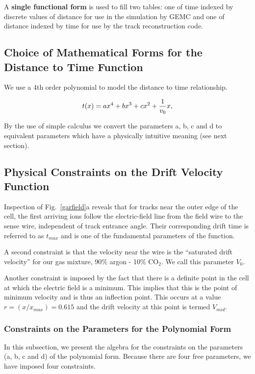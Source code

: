 A {\bf single functional form} is used to fill two tables: one of time indexed by discrete
values of distance for use in the simulation by GEMC and one of 
distance indexed by time for use by the track reconstruction code.


\subsection{Choice of Mathematical Forms for the Distance to Time Function}
We use a 4th order polynomial to model the distance to time relationship.

\begin{equation}
t(x) =  a x^4 + b x^3 + c x^2 + {1 \over v_0} x,
\end{equation}


By the use of simple calculus we convert the parameters a, b, c and d to equivalent parameters which have
a physically intuitive meaning (see next section).

\subsection{Physical Constraints on the Drift Velocity Function}

Inspection of  Fig.~\ref{garfield}a reveals that for tracks near the outer
edge of the cell, the first arriving ions follow the electric-field line from 
the field wire to the sense wire, independent of track entrance angle.  Their 
corresponding drift time is referred to as $t_{max}$ and is one of the fundamental
parameters of the function. 

A second constraint is that the velocity near the wire is the ``saturated drift
velocity'' for our gas mixture, 90$\%$ argon - 10$\%$ CO$_2$.  We call this parameter $V_0$.

Another constraint is imposed by the fact that there is a definite point in the
cell at which the electric field is a minimum.  This implies that this is the point
of minimum velocity and is thus an inflection point.  This occurs at a value
$r = (x/x_{max}) = 0.615$ and the drift velocity at this point is termed $V_{mid}$.

\subsubsection{Constraints on the Parameters for the Polynomial Form}
In this subsection, we present the algebra for the constraints on the parameters
(a, b, c and d) of the polynomial form.  Because there are four free parameters, we
have imposed four constraints.

